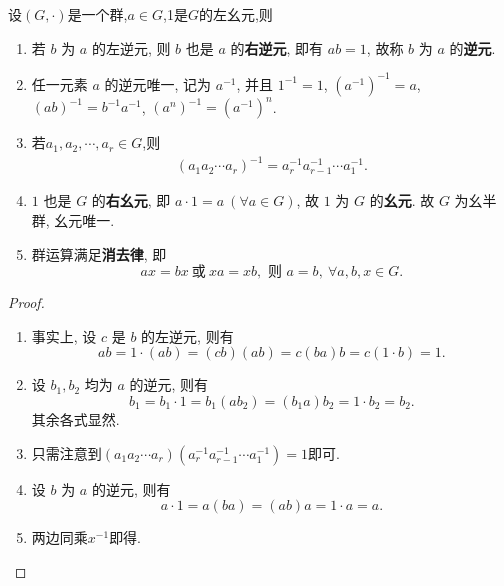 \documentclass[../../main.tex]{subfiles}%
\begin{document}
\begin{theorem}[群的基本性质]\label{theorem:抽象代数--群的基本性质}
设$(G,\cdot)$是一个群,$a\in G$,1是$G$的左幺元,则
\begin{enumerate}[(1)]
\item 若 \( b \) 为 \( a \) 的左逆元, 则 \( b \) 也是 \( a \) 的\textbf{右逆元}, 即有 \( ab = 1 \), 故称 \( b \) 为 \( a \) 的\textbf{逆元}.

\item 任一元素 \( a \) 的逆元唯一, 记为 \( a^{-1} \), 并且 \( 1^{-1} = 1 \), \( (a^{-1})^{-1} = a \), \( (ab)^{-1} = b^{-1}a^{-1} \), \( (a^n)^{-1} = (a^{-1})^n \).

\item 若$a_1,a_2,\cdots,a_r\in G$,则
\begin{align*}
(a_1a_2\cdots a_r)^{-1}=a_r^{-1}a_{r-1}^{-1}\cdots a_1^{-1}.
\end{align*}

\item \( 1 \) 也是 \( G \) 的\textbf{右幺元}, 即 \( a \cdot 1 = a \ (\forall a \in G) \), 故 \( 1 \) 为 \( G \) 的\textbf{幺元}. 故 \( G \) 为幺半群, 幺元唯一.

\item\label{theorem:抽象代数--群的基本性质-4} 群运算满足\textbf{消去律}, 即
\[
ax = bx \ \text{或}\ xa = xb, \text{ 则 } a = b, \ \forall a, b, x \in G.
\]
\end{enumerate}
\end{theorem}
\begin{proof}
\begin{enumerate}[(1)]
\item 事实上, 设 \( c \) 是 \( b \) 的左逆元, 则有
\[
ab = 1 \cdot (ab) = (cb)(ab) = c(ba)b = c(1 \cdot b) = 1.
\]

\item 设 \( b_1, b_2 \) 均为 \( a \) 的逆元, 则有
\[
b_1 = b_1 \cdot 1 = b_1(ab_2) = (b_1a)b_2 = 1 \cdot b_2 = b_2.
\]
其余各式显然.

\item 只需注意到$(a_1a_2\cdots a_r)(a_r^{-1}a_{r-1}^{-1}\cdots a_1^{-1})=1$即可.

\item 设 \( b \) 为 \( a \) 的逆元, 则有
\[
a \cdot 1 = a(ba) = (ab)a = 1 \cdot a = a.
\]

\item 两边同乘$x^{-1}$即得.
\end{enumerate}

\end{proof}
\end{document}
